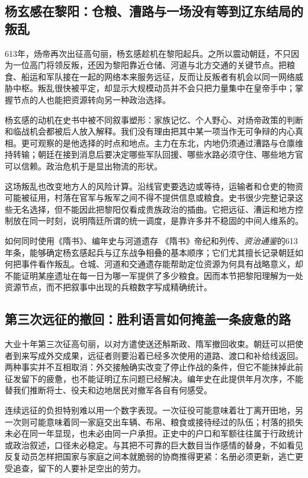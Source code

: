 \subsection{杨玄感在黎阳：仓粮、漕路与一场没有等到辽东结局的叛乱}
613年，炀帝再次出征高句丽，杨玄感趁机在黎阳起兵。之所以震动朝廷，不只因为一位高门将领反叛，还因为黎阳靠近仓储、河道与北方交通的关键节点。把粮食、船运和军队接在一起的网络本来服务远征，反而让反叛者有机会以同一网络威胁中枢。叛乱很快被平定，却显示大规模动员并不会只把力量集中在皇帝手中；掌握节点的人也能把资源转向另一种政治选择。

杨玄感的动机在史书中被不同叙事塑形：家族记忆、个人野心、对炀帝政策的判断和临战机会都被后人放入解释。我们没有理由把其中某一项当作无可争辩的内心真相。更可观察的是他选择的时点和地点。主力在东北，内地仍须通过漕路与仓廪维持转输；朝廷在接到消息后要决定哪些军队回援、哪些水路必须守住、哪些地方官可以信赖。政治危机于是显出物流的形状。

这场叛乱也改变地方人的风险计算。沿线官吏要选边或等待，运输者和仓吏的物资可能被征用，村落在官军与叛军之间不得不提供信息或粮食。史书很少完整记录这些无名选择，但不能因此把黎阳仅看成贵族政治的插曲。它把远征、漕运和地方控制放在同一时刻，说明隋廷所谓的统一调度，是靠许多并不稳固的中间人维系的。

\begin{sourcenote}{如何同时使用《隋书》、编年史与河道遗存}
《隋书》帝纪和列传、\textit{资治通鉴}的613年条，能够确定杨玄感起兵与辽东战争相叠的基本顺序；它们尤其擅长记录朝廷如何把事件看作叛乱。仓城、河道和交通遗存能帮助定位资源为何具有战略意义，却不能证明某座遗址在每一日为哪一军提供了多少粮食。因而本节把黎阳理解为一处资源节点，而不把叙事中出现的兵粮数字写成精确统计。
\end{sourcenote}

\subsection{第三次远征的撤回：胜利语言如何掩盖一条疲惫的路}
大业十年第三次征高句丽，以对方遣使送还斛斯政、隋军撤回收束。朝廷可以把使者到来写成外交成果，远征者则要沿着已经多次使用的道路、渡口和补给线返回。两种事实并不互相取消：外交接触确实改变了停止作战的条件，但它不能抹掉此前征发留下的疲惫，也不能证明辽东问题已经解决。编年史在此提供年月次序，不能替我们推断将士、役夫和边地居民对撤军各自有何感受。

连续远征的负担特别难以用一个数字表现。一次征役可能意味着壮丁离开田地，另一次则可能意味着同一家庭交出车辆、布帛、粮食或接待经过的队伍；村落的损失未必在同一年显现，也未必由同一户承担。正史中的户口和军额往往属于行政统计或政治叙述，口径未必稳定。与其把不可靠的巨大数目当作感情的替身，不如看见反复动员怎样把国家与家庭之间本就脆弱的协商推得更紧：名册必须更新，逃亡更受追查，留下的人要补足空出的劳力。

